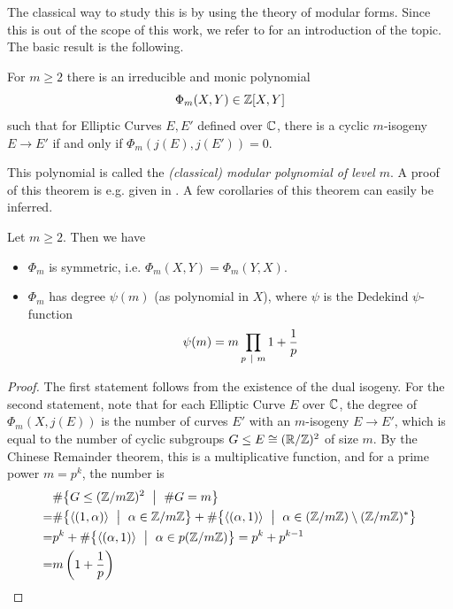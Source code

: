 The classical way to study this is by using the theory of modular forms.
Since this is out of the scope of this work, we refer to \cite[§11]{cox_primes_of_form} for an introduction of the topic.
The basic result is the following.
\begin{theorem}
    \label{prop:complex_mod_poly}
    For $m \geq 2$ there is an irreducible and monic polynomial
    \begin{equation*}
        \Phi_m(X, Y) \in \mathbb{Z}[X, Y]
    \end{equation*}
    such that for Elliptic Curves $E, E'$ defined over $\mathbb{C}$, there is a cyclic $m$-isogeny $E \to E'$ if and only if $\Phi_m(j(E), j(E')) = 0$.
\end{theorem}
This polynomial is called the \emph{(classical) modular polynomial of level $m$}.
A proof of this theorem is e.g. given in \cite[Thm~11.18]{cox_primes_of_form}.
A few corollaries of this theorem can easily be inferred.
\begin{corollary}
    Let $m \geq 2$. Then we have
    \begin{itemize}
        \item $\Phi_m$ is symmetric, i.e. $\Phi_m(X, Y) = \Phi_m(Y, X)$.
        \item $\Phi_m$ has degree $\psi(m)$ (as polynomial in $X$), where $\psi$ is the Dedekind $\psi$-function
        \begin{equation*}
            \psi(m) = m \prod_{p \ \mid \  m} 1 + \frac 1 p
        \end{equation*}
    \end{itemize}
\end{corollary}
\begin{proof}
    The first statement follows from the existence of the dual isogeny.
    For the second statement, note that for each Elliptic Curve $E$ over $\mathbb{C}$, the degree of $\Phi_m(X, j(E))$ is the number of curves $E'$ with an $m$-isogeny $E \to E'$, which is equal to the number of cyclic subgroups $G \leq E \cong (\mathbb{R}/\mathbb{Z})^2$ of size $m$.
    By the Chinese Remainder theorem, this is a multiplicative function, and for a prime power $m = p^k$, the number is
    \begin{align*}
       &\#\bigl\{ G \leq (\Z/m\Z)^2 \ \bigm| \ \#G = m \bigr\} \\
       =& \#\bigl\{ \langle (1, \alpha) \rangle \ \bigm| \ \alpha \in \Z/m\Z \bigr\} + \#\bigl\{ \langle (\alpha, 1) \rangle \ \bigm| \ \alpha \in (\Z/m\Z) \setminus (\Z/m\Z)^* \bigr\} \\
       =& p^k + \#\bigl\{ \langle (\alpha, 1) \rangle \ \bigm| \ \alpha \in p(\Z/m\Z) \bigr\} = p^k + p^{k - 1} \\
       =& m \left( 1 + \frac 1 p \right) \qedhere
    \end{align*}
\end{proof}
